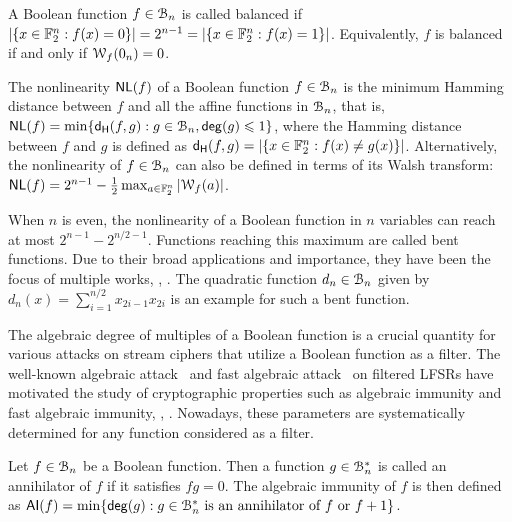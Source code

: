 \documentclass{llncs}
\begin{document}
\begin{definition}[Balancedness]
	A Boolean function $f\in\mathcal{B}_n$ is called balanced if $|\{x \in \mathbb{F}_2^n : f(x)=0\}|=2^{n-1}=|\{x \in \mathbb{F}_2^n : f(x)=1\}|$. Equivalently, $f$ is balanced if and only if $\mathcal W_{f}(0_n)=0$.
\end{definition}

\begin{definition}
	\label{def:nl}
	The nonlinearity $\mathsf{NL}(f)$ of a Boolean function $f\in \mathcal{B}_n$ is the minimum Hamming distance between $f$ and all the affine functions in $\mathcal{B}_n$, that is, $\mathsf{NL}(f) = \min\{ \mathsf{d_H}(f,g):g\in\mathcal{B}_n,\mathsf{deg}(g)\leqslant 1\}$, where the Hamming distance between $f$ and $g$ is defined as $\mathsf{d_H}(f,g)=|\{x\in\mathbb{F}_2^n:f(x)\neq g(x)\}|$. Alternatively, the nonlinearity of $f\in\mathcal{B}_n$ can also be defined in terms of its Walsh transform: $\mathsf{NL}(f) = 2^{n-1}- \frac{1}{2} \max_{a\in \mathbb{F}_2^n}{|\mathcal W_{f}(a)|}$.
\end{definition}

When $n$ is even, the nonlinearity of a Boolean function in $n$ variables can reach at most $2^{n-1}-2^{n/2 -1}$. Functions reaching this maximum are called bent functions. Due to their broad applications and importance, they have been the focus of multiple works, \eg, \cite{Rothaus76,FSE:Dobbertin95,DBLP:conf/itw/BudaghyanCH11,Tokareva15,Mesnager16}.  The quadratic function $d_n\in\mathcal{B}_n$ given by $d_n(x)=\sum_{i=1}^{n/2}x_{2i-1}x_{2i}$ is an example for such a bent function.

\bigskip

The algebraic degree of multiples of a Boolean function is a crucial quantity for various attacks on stream ciphers that utilize a Boolean function as a filter.  The well-known algebraic attack~\cite{EC:CouMei03} and fast algebraic attack~\cite{C:Courtois03} on filtered \textsf{LFSR}s have motivated the study of cryptographic properties such as algebraic immunity and fast algebraic immunity, \eg, \cite{FSE:Armknecht04,C:HawRos04,ISC:JiaZhaWan13}. Nowadays, these parameters are systematically determined for any function considered as a filter.

\begin{definition} \label{def:ai}
	Let $f\in\mathcal{B}_n$ be a Boolean function. Then a function $g\in\mathcal{B}_n^*$ is called an annihilator of $f$ if it satisfies $fg=0$. The algebraic immunity of $f$ is then defined as $\mathsf{AI}(f) = \min\{ \mathsf{deg}(g):\text{$g\in\mathcal{B}_n^*$ is an annihilator of $f$ or $f+1$}\}$.
\end{definition}
\end{document}

